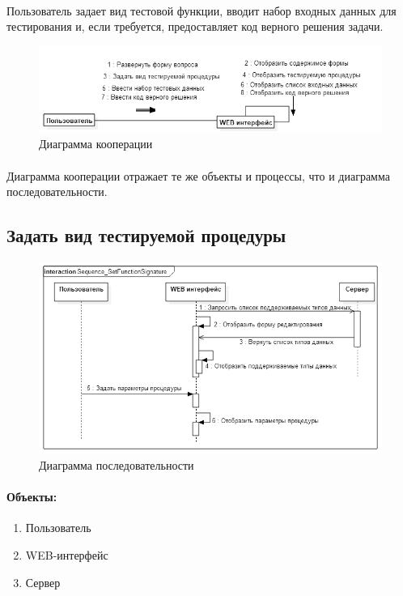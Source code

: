 \documentclass{article}
\begin{document}
        \paragraph{}
        Пользователь задает вид тестовой функции, вводит набор входных данных
        для тестирования и, если требуется, предоставляет код верного решения задачи.
        \begin{figure}[H]
            \includegraphics[width=\textwidth, center]{Communication_AddQuestion}
            \caption{Диаграмма кооперации}
        \end{figure}
        \paragraph{}
        Диаграмма кооперации отражает те же объекты и процессы, что и диаграмма
        последовательности.


    \subsection{Задать вид тестируемой процедуры}
        \begin{figure}[H]
            \includegraphics[width=\textwidth, center]
                {Sequence_SetFunctionSignature}
            \caption{Диаграмма последовательности}
        \end{figure}
        \paragraph{Объекты:}
        \begin{enumerate}
            \item Пользователь
            \item WEB-интерфейс
            \item Сервер
        \end{enumerate}
\end{document}
